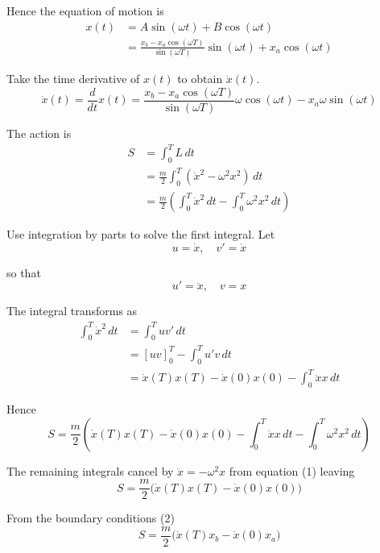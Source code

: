 Hence the equation of motion is
\begin{align*}
x(t)&=A\sin(\omega t)+B\cos(\omega t)
\\
&=\frac{x_b-x_a\cos(\omega T)}{\sin(\omega T)}\sin(\omega t)+x_a\cos(\omega t)
\tag{3}
\end{align*}

Take the time derivative of $x(t)$ to obtain $\dot x(t)$.
\begin{equation*}
\dot x(t)=\frac{d}{dt}x(t)
=\frac{x_b-x_a\cos(\omega T)}{\sin(\omega T)}\omega\cos(\omega t)-x_a\omega\sin(\omega t)
\tag{4}
\end{equation*}

The action is
\begin{align*}
S&=\int_0^TL\,dt
\\
&=\frac{m}{2}\int_0^T (\dot{x}^2-\omega^2 x^2)\,dt
\\
&=\frac{m}{2}\left(
\int_0^T\dot{x}^2\,dt
-\int_0^T\omega^2x^2\,dt
\right)
\end{align*}

Use integration by parts to solve the first integral.
Let
\begin{equation*}
u=\dot x,\quad v'=\dot x
\end{equation*}

so that
\begin{equation*}
u'=\ddot x,\quad v=x
\end{equation*}

The integral transforms as
\begin{align*}
\int_0^T \dot x^2\,dt
&=\int_0^T uv'\,dt
\\
&=[uv]_0^T
-\int_0^Tu'v\,dt
\\
&=\dot x(T)x(T)-\dot x(0)x(0)-\int_0^T\ddot xx\,dt
\end{align*}

Hence
\begin{equation*}
S=\frac{m}{2}\left(
\dot x(T)x(T)-\dot x(0)x(0)
-\int_0^T \ddot xx\,dt
-\int_0^T\omega^2x^2\,dt
\right)
\end{equation*}

The remaining integrals cancel by $\ddot x=-\omega^2x$ from equation (1) leaving
\begin{equation*}
S=\frac{m}{2}\bigl(\dot x(T)x(T)-\dot x(0)x(0)\bigr)
\tag{5}
\end{equation*}

From the boundary conditions (2)
\begin{equation*}
S=\frac{m}{2}\bigl(\dot x(T)x_b-\dot x(0)x_a\bigr)
\end{equation*}

